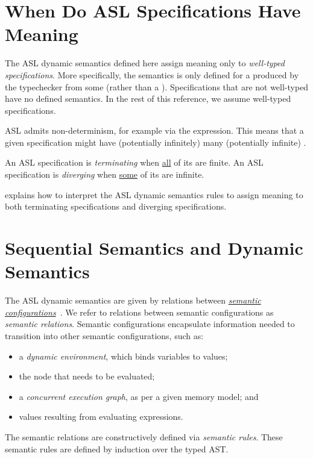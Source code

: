 \section{When Do ASL Specifications Have Meaning\label{sec:MeaningfulASLSpecifications}}
The ASL dynamic semantics defined here assign meaning only to \emph{well-typed specifications}.
More specifically, the semantics is only defined for a \typedast{} produced by the typechecker
from some \untypedast{} (rather than a \typingerrorterm{}).
Specifications that are not well-typed have no defined semantics.
In the rest of this reference, we assume well-typed specifications.

ASL admits non-determinism, for example via the \ARBITRARY{} expression.
This means that a given specification might have (potentially infinitely) many
(potentially infinite) \derivationtreesterm.

An ASL specification is \emph{terminating} when \underline{all} of its \derivationtreesterm{} are finite.
An ASL specification is \emph{diverging} when \underline{some} of its \derivationtreesterm{} are
infinite.

 explains how to interpret
the ASL dynamic semantics rules to assign meaning to both terminating specifications
and diverging specifications.

\section{Sequential Semantics and Dynamic Semantics\label{sec:Sequential Semantics and Dynamic Semantics}}
The ASL dynamic semantics are given by relations between
\hyperlink{def-configuration}{\emph{semantic configurations}}~\cite{SemanticsWithApplicationsBook}.
We refer to relations between semantic configurations as \emph{semantic relations}.
Semantic configurations encapsulate information needed to transition into other semantic configurations, such as:
\begin{itemize}
  \item a \emph{dynamic environment}, which binds variables to values;
  \item the \typedast{} node that needs to be evaluated;
  \item a \emph{concurrent execution graph}, as per a given memory model; and
  \item values resulting from evaluating expressions.
\end{itemize}
The semantic relations are constructively defined via \emph{semantic rules}.
These semantic rules are defined by induction over the typed AST.

